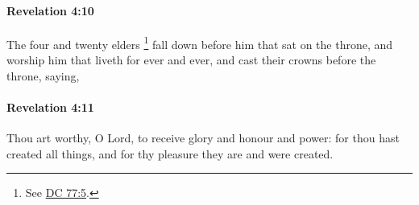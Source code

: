 		\paragraph{Revelation 4:10} %
			\label{REVELATIONNT-4-10}

			The four and twenty	elders%
				\footnote{%
					See \hyperref[DC77-5]{DC 77:5}.
					}
			fall down before him that sat on the throne, and worship him that liveth for ever and ever, and cast their crowns before the throne, saying,

			\begin{framed}
			\scriptsize
				\begin{compactdesc}
					\item[SBLG] 
				\end{compactdesc}
			\end{framed}

		\paragraph{Revelation 4:11} %
			\label{REVELATIONNT-4-11}

			Thou art worthy, O Lord, to receive glory and honour and power: for thou hast created all things, and for thy pleasure they are and were created.

